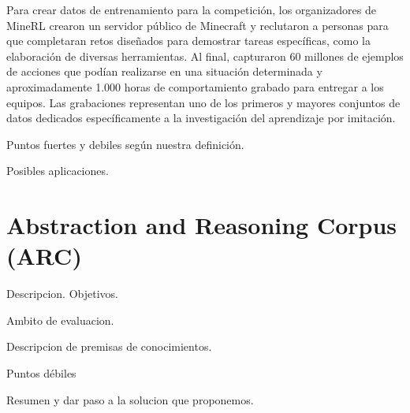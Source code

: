 Para crear datos de entrenamiento para la competición, los organizadores de MineRL crearon un servidor público de Minecraft y reclutaron a personas para que completaran retos diseñados para demostrar tareas específicas, como la elaboración de diversas herramientas. Al final, capturaron 60 millones de ejemplos de acciones que podían realizarse en una situación determinada y aproximadamente 1.000 horas de comportamiento grabado para entregar a los equipos. Las grabaciones representan uno de los primeros y mayores conjuntos de datos dedicados específicamente a la investigación del aprendizaje por imitación.

Puntos fuertes y debiles según nuestra definición.

Posibles aplicaciones.

\section{Abstraction and Reasoning Corpus (ARC)}\label{section:state-of-the-art:arc}

Descripcion. Objetivos.

Ambito de evaluacion.

Descripcion de premisas de conocimientos.

Puntos débiles

Resumen y dar paso a la solucion que proponemos.
